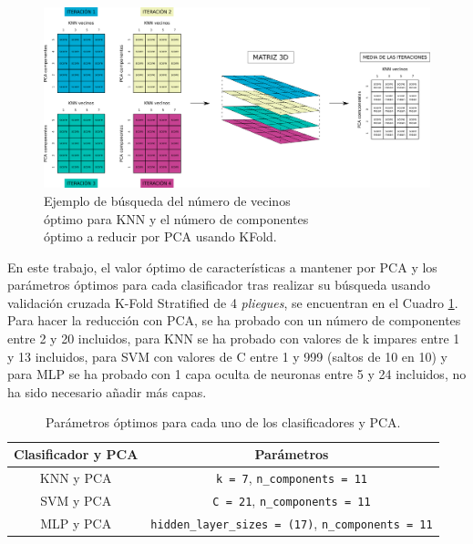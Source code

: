 \begin{figure} [h!]
  \begin{center}
    \includegraphics[width=16cm]{figs/KFold_KNN_PCA.png}
  \end{center}
  \captionsetup{justification=centering}
  \caption{Ejemplo de búsqueda del número de vecinos\\
  óptimo para KNN y el número de componentes\\
  óptimo a reducir por PCA usando KFold.}
  \label{fig:kfold_KNN_PCA}
\end{figure}

En este trabajo, el valor óptimo de características a mantener por PCA y los parámetros óptimos para cada clasificador tras realizar su búsqueda usando validación cruzada K-Fold Stratified de 4 \textit{pliegues}, se encuentran en el Cuadro \ref{cuadro:parametros_optimos}. Para hacer la reducción con PCA, se ha probado con un número de componentes entre 2 y 20 incluidos, para KNN se ha probado con valores de k impares entre 1 y 13 incluidos, para SVM con valores de C entre 1 y 999 (saltos de 10 en 10) y para MLP se ha probado con 1 capa oculta de neuronas entre 5 y 24 incluidos, no ha sido necesario añadir más capas.\\

\begin{table}[H]
\begin{center}
\begin{tabular}{|c|c|}
     \hline
    \textbf{Clasificador y PCA} & \textbf{Parámetros} \\
    \hline
     KNN y PCA & \verb|k = 7|, \verb|n_components = 11|\\
     SVM y PCA & \verb|C = 21|, \verb|n_components = 11|\\
     MLP y PCA & \verb|hidden_layer_sizes = (17)|, \verb|n_components = 11|\\
     \hline
 \end{tabular}
 \captionsetup{justification=centering}
\caption{Parámetros óptimos para cada uno de los clasificadores y PCA.}
\label{cuadro:parametros_optimos}
\end{center}
\end{table}


